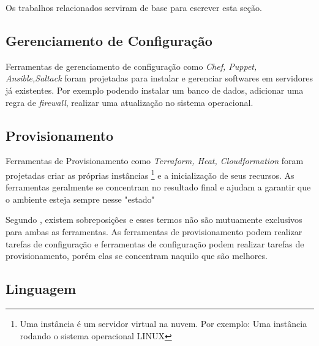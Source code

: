 Os trabalhos relacionados serviram de base para escrever esta seção. 

\subsection{Gerenciamento de Configuração} 
Ferramentas de gerenciamento de configuração como \textit{Chef, Puppet, Ansible,Saltack} foram projetadas para instalar e gerenciar softwares em servidores já existentes. Por exemplo podendo instalar um banco de dados, adicionar uma regra de \textit{firewall}, realizar uma atualização no sistema operacional. 


\subsection{Provisionamento}

Ferramentas de Provisionamento como \textit{Terraform, Heat, Cloudformation} foram projetadas criar as próprias instâncias \footnote{Uma instância é um servidor virtual na nuvem. Por exemplo: Uma instância rodando o sistema operacional LINUX} e a inicialização de seus recursos. As ferramentas geralmente se concentram no resultado final e ajudam a garantir que o ambiente esteja sempre nesse "estado" 

Segundo , existem sobreposições e esses termos não são mutuamente exclusivos para ambas as ferramentas. As ferramentas de provisionamento podem realizar tarefas de configuração e ferramentas de configuração podem realizar tarefas de provisionamento, porém elas se concentram naquilo que são melhores. 


\subsection{Linguagem}

